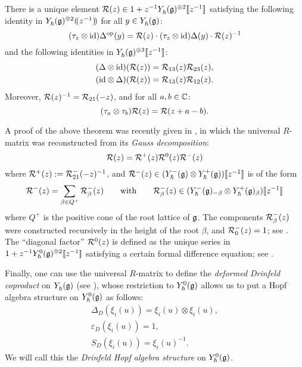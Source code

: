 \begin{theorem}\label{T:R}
    There is a unique element $\rmat(z)\in 1+z^{-1}\Yhg^{\otimes 2}\db{z^{-1}}$ satisfying the following identity in $\Yhg^{\otimes 2}\dparen{z^{-1}}$ for all $y\in\Yhg$:
    \begin{equation}\label{eqn:R-intertwiner}
        (\tau_z\otimes{\id})\Delta^{\mathrm{op}}(y) = \rmat(z) \cdot (\tau_z\otimes{\id})\Delta(y) \cdot \rmat(z)^{-1}
    \end{equation}
    and the following identities in $\Yhg^{\otimes 3}\db{z^{-1}}$:
    \begin{gather*}
        (\Delta\otimes{\id})(\rmat(z)) = \rmat_{13}(z)\rmat_{23}(z), \\
        ({\id}\otimes\Delta)(\rmat(z)) = \rmat_{13}(z)\rmat_{12}(z).
    \end{gather*}
    Moreover, $\rmat(z)^{-1} = \rmat_{21}(-z)$, and for all $a,b\in\C$:
    \[(\tau_a\otimes\tau_b)\rmat(z) = \rmat(z+a-b).\]
\end{theorem}

A proof of the above theorem was recently given in \cite{gautam_meromorphic_2021}, in which the universal $R$-matrix was reconstructed from its \emph{Gauss decomposition}:
\[\rmat(z) = \rmat^+(z)\rmat^0(z)\rmat^-(z)\]
where $\rmat^+(z) := \rmat^-_{21}(-z)^{-1}$, and $\rmat^-(z)\in(\Yhg[-]\otimes\Yhg[+])\db{z^{-1}}$ is of the form
\[\rmat^-(z) = \sum_{\beta\in Q^+}\rmat_\beta^-(z) \qquad\text{with}\qquad \rmat_\beta^-(z) \in(\Yhg[-]_{-\beta}\otimes\Yhg[+]_\beta)\db{z^{-1}}\]
where $Q^+$ is the positive cone of the root lattice of $\g$.
The components $\rmat_\beta^-(z)$ were constructed recursively in the height of the root $\beta$, and $\rmat_0^-(z)=1$; see \cite[\S 4.2]{gautam_meromorphic_2021}.
The ``diagonal factor'' $\rmat^0(z)$ is defined as the unique series in $1+z^{-1}\Yhg[0]^{\otimes 2}\db{z^{-1}}$ satisfying a certain formal difference equation; see \cite[\S6]{gautam_meromorphic_2021}.

Finally, one can use the universal $R$-matrix to define the \emph{deformed Drinfeld coproduct} on $\Yhg$ (see \cite[\S 3]{gautam_meromorphic_2021}), whose restriction to $\Yhg[0]$ allows us to put a Hopf algebra structure on $\Yhg[0]$ as follows:
\begin{gather*}
    \Delta_D(\xi_i(u)) = \xi_i(u)\otimes\xi_i(u), \\
    \varepsilon_D(\xi_i(u)) = 1, \\
    S_D(\xi_i(u)) = \xi_i(u)^{-1}.
\end{gather*}
We will call this the \emph{Drinfeld Hopf algebra structure} on $\Yhg[0]$.


